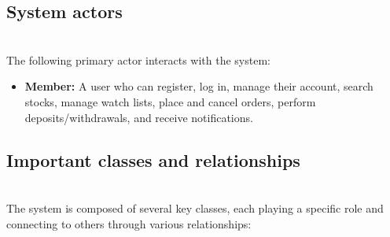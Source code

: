 \subsection{System actors}\label{b1xXF96foE5q9XfcLAb7P}
\\
The following primary actor interacts with the system:

\begin{itemize}
\item
\protect{}\label{dlGURMihPIwhz_lrv3SBj}
\textbf{Member:} A user who can register, log in, manage their account, search stocks, manage watch lists, place and cancel orders, perform deposits/withdrawals, and receive notifications.
\end{itemize}

\subsection{Important classes and relationships}\label{CNsksPXMb7T5DNRfIr67M}
\\
The system is composed of several key classes, each playing a specific role and connecting to others through various relationships:

